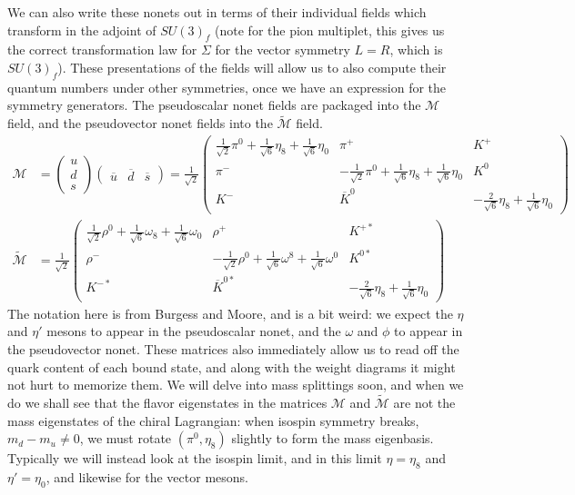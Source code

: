 \documentclass[11pt, oneside]{article}   	%
\theoremstyle{definition}
\numberwithin{equation}{subsection}		%
\begin{document}
We can also write these nonets out in terms of their individual fields which transform in the adjoint of 
$SU(3)_f$ (note for the pion multiplet, this gives us the correct transformation law for $\Sigma$ for the vector symmetry $L = R$, 
which is $SU(3)_f$). These presentations of the fields will allow us to also compute their quantum numbers under other 
symmetries, once we have an expression for the symmetry generators. The pseudoscalar nonet fields are packaged into the 
$\mathcal M$ field, and the pseudovector nonet fields into the $\tilde{\mathcal{M}}$ field. 
\begin{align}
	\mathcal M &= \begin{pmatrix} u \\ d \\ s \end{pmatrix} \begin{pmatrix} \overline u & \overline d & \overline s \end{pmatrix} = 
	\frac{1}{\sqrt 2}\begin{pmatrix} \frac{1}{\sqrt 2}\pi^0 + \frac{1}{\sqrt 6} \eta_8 + \frac{1}{\sqrt 6}\eta_0 & \pi^+ & K^+ \\ \pi^- & -\frac{1}{\sqrt 2}\pi^0 + \frac{1}{\sqrt 6} \eta_8 + \frac{1}{\sqrt 6}\eta_0
	& K^0 \\ K^- & \overline K^0 & - \frac{2}{\sqrt 6} \eta_8 + \frac{1}{\sqrt 6}\eta_0 \end{pmatrix} \nonumber \\
	\tilde{\mathcal{M}} &= \frac{1}{\sqrt 2}\begin{pmatrix} \frac{1}{\sqrt 2}\rho^0 + \frac{1}{\sqrt 6}\omega_8 + \frac{1}{\sqrt 6}\omega_0 & \rho^+ & K^{+*} \\ \rho^- & -\frac{1}{\sqrt 2}\rho^0 + \frac{1}{\sqrt 6} \omega^8 + \frac{1}{\sqrt 6}\omega^0
	& K^{0*} \\ K^{-*} & \overline K^{0*} & - \frac{2}{\sqrt 6} \eta_8 + \frac{1}{\sqrt 6}\eta_0 \end{pmatrix}
\end{align}
The notation here is from Burgess and Moore, and is a bit weird: we expect the $\eta$ and $\eta'$ mesons to appear in the pseudoscalar 
nonet, and the $\omega$ and $\phi$ to appear in the pseudovector nonet. These matrices also immediately allow us to read off the quark 
content of each bound state, and along with the weight diagrams it might not hurt to memorize them. We will delve into mass splittings soon, 
and when we do we shall see that the flavor eigenstates in the matrices $\mathcal M$ and $\tilde{\mathcal{M}}$ are not the mass 
eigenstates of the chiral Lagrangian: when isospin symmetry breaks, $m_d - m_u\neq 0$, we must rotate $(\pi^0, \eta_8)$ slightly to form 
the mass eigenbasis. Typically we will instead look at the isospin limit, and in this limit $\eta = \eta_8$ and $\eta' = \eta_0$, and likewise for 
the vector mesons. 
\end{document}
